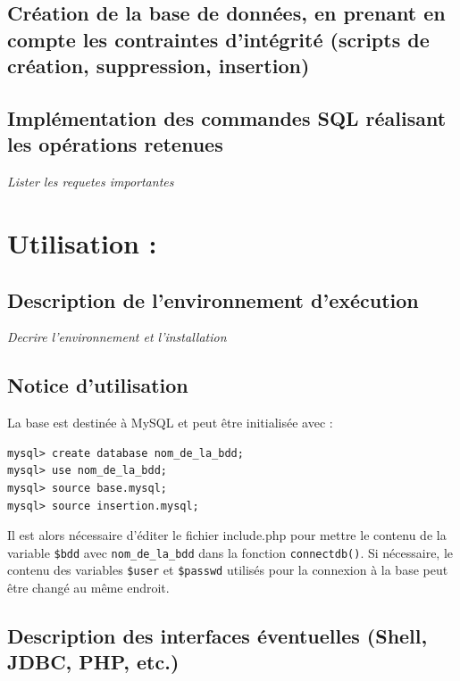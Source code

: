 \documentclass[12pt]{report}
\begin{document}
\subsection{Création de la base de données, en prenant en compte les contraintes d'intégrité (scripts de création, suppression, insertion)}

\subsection{Implémentation des commandes SQL réalisant les opérations retenues}

\emph{Lister les requetes importantes}

\section{Utilisation :}

\subsection{Description de l'environnement d'exécution}

\emph{Decrire l'environnement et l'installation}

\subsection{Notice d'utilisation}

La base est destinée à MySQL et peut être initialisée avec :
\begin{verbatim}
mysql> create database nom_de_la_bdd;
mysql> use nom_de_la_bdd;
mysql> source base.mysql;
mysql> source insertion.mysql;
\end{verbatim}

Il est alors nécessaire d'éditer le fichier include.php pour mettre le contenu
de la variable \verb!$bdd! avec \verb!nom_de_la_bdd! dans la fonction
\verb!connectdb()!. Si nécessaire, le contenu des variables \verb!$user! et
\verb!$passwd! utilisés pour la connexion à la base peut être changé au même
endroit.

\subsection{Description des interfaces éventuelles (Shell, JDBC, PHP, etc.)}
\end{document}
